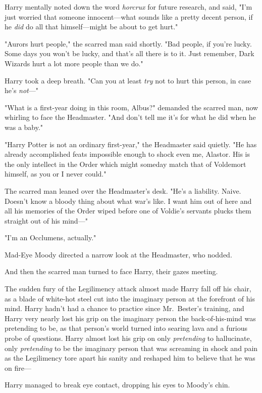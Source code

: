 Harry mentally noted down the word \emph{horcrux} for future research, and
said, "I'm just worried that someone innocent—what sounds like a pretty
decent person, if he \emph{did} do all that himself—might be about to get
hurt."

"Aurors hurt people," the scarred man said shortly. "Bad people, if you're
lucky. Some days you won't be lucky, and that's all there is to it. Just
remember, Dark Wizards hurt a lot more people than we do."

Harry took a deep breath. "Can you at least \emph{try} not to hurt this person,
in case he's \emph{not}—"

"What is a first-year doing in this room, Albus?" demanded the scarred man, now
whirling to face the Headmaster. "And don't tell me it's for what he did when
he was a baby."

"Harry Potter is not an ordinary first-year," the Headmaster said quietly. "He
has already accomplished feats impossible enough to shock even me, Alastor. His
is the only intellect in the Order which might someday match that of Voldemort
himself, as you or I never could."

The scarred man leaned over the Headmaster's desk. "He's a liability. Naive.
Doesn't know a bloody thing about what war's like. I want him out of here and
all his memories of the Order wiped before one of Voldie's servants plucks them
straight out of his mind—"

"I'm an Occlumens, actually."

Mad-Eye Moody directed a narrow look at the Headmaster, who nodded.

And then the scarred man turned to face Harry, their gazes meeting.

The sudden fury of the Legilimency attack almost made Harry fall off his chair,
as a blade of white-hot steel cut into the imaginary person at the forefront of
his mind. Harry hadn't had a chance to practice since Mr.~Bester's training,
and Harry very nearly lost his grip on the imaginary person the
back-of-his-mind was pretending to be, as that person's world turned into
searing lava and a furious probe of questions. Harry almost lost his grip on
only \emph{pretending} to hallucinate, only \emph{pretending} to be the
imaginary person that was screaming in shock and pain as the Legilimency tore
apart his sanity and reshaped him to believe that he was on fire—

Harry managed to break eye contact, dropping his eyes to Moody's chin.

